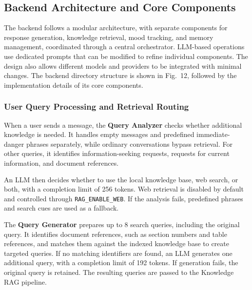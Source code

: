 \documentclass[conference]{IEEEtran}
\begin{document}
\subsection{Backend Architecture and Core Components}

The backend follows a modular architecture, with separate components for response generation, knowledge retrieval, mood tracking, and memory management, coordinated through a central orchestrator. LLM-based operations use dedicated prompts that can be modified to refine individual components. The design also allows different models and providers to be integrated with minimal changes. The backend directory structure is shown in Fig.~12, followed by the implementation details of its core components.

\subsubsection{User Query Processing and Retrieval Routing}
When a user sends a message, the \textbf{Query Analyzer} checks whether additional knowledge is needed. It handles empty messages and predefined immediate-danger phrases separately, while ordinary conversations bypass retrieval. For other queries, it identifies information-seeking requests, requests for current information, and document references.

An LLM then decides whether to use the local knowledge base, web search, or both, with a completion limit of 256 tokens. Web retrieval is disabled by default and controlled through \texttt{RAG\_ENABLE\_WEB}. If the analysis fails, predefined phrases and search cues are used as a fallback.

The \textbf{Query Generator} prepares up to 8 search queries, including the original query. It identifies document references, such as section numbers and table references, and matches them against the indexed knowledge base to create targeted queries. If no matching identifiers are found, an LLM generates one additional query, with a completion limit of 192 tokens. If generation fails, the original query is retained. The resulting queries are passed to the Knowledge RAG pipeline.
\end{document}
